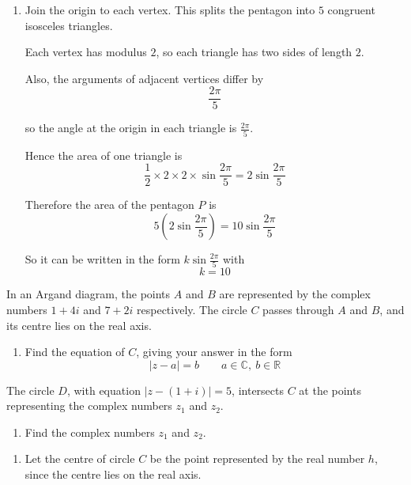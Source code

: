 \documentclass[leqno]{article}
\begin{document}
\begin{enumerate}[
  label=\textbf{\arabic*.},
  leftmargin=*,
  topsep=0pt,
  partopsep=0pt,
  parsep=0pt
]
\begin{djsSolution}
\begin{enumerate}[label=\textbf{(\alph*)}]
  \item Join the origin to each vertex. This splits the pentagon into $5$ congruent isosceles triangles.

Each vertex has modulus $2$, so each triangle has two sides of length $2$.

Also, the arguments of adjacent vertices differ by
\[
\frac{2\pi}{5}
\]

so the angle at the origin in each triangle is $\frac{2\pi}{5}$.

Hence the area of one triangle is
\[
\frac12 \times 2 \times 2 \times \sin\frac{2\pi}{5}
=2\sin\frac{2\pi}{5}
\]

Therefore the area of the pentagon $P$ is
\[
5\left(2\sin\frac{2\pi}{5}\right)=10\sin\frac{2\pi}{5}
\]

So it can be written in the form $k\sin\frac{2\pi}{5}$ with
\[
k=10
\]
\end{enumerate}
\end{djsSolution}


\newpage

\questionitem

In an Argand diagram, the points $A$ and $B$ are represented by the complex numbers $1+4i$ and $7+2i$ respectively. The circle $C$ passes through $A$ and $B$, and its centre lies on the real axis. \\
\begin{enumerate}[label=\textbf{(\alph*)}]
  \item Find the equation of $C$, giving your answer in the form
  \[
  |z-a|=b \qquad a\in\mathbb{C},\ b\in\mathbb{R}
  \]
\end{enumerate}
The circle $D$, with equation $|z-(1+i)|=5$, intersects $C$ at the points representing the complex numbers $z_1$ and $z_2$. \\
\begin{enumerate}[label=\textbf{(\alph*)}, resume]
  \item Find the complex numbers $z_1$ and $z_2$.  \\
\end{enumerate}

\vspace*{10pt}

\begin{djsSolution}
\begin{enumerate}[label=\textbf{(\alph*)}]
  \item Let the centre of circle $C$ be the point represented by the real number $h$, since the centre lies on the real axis.


\end{enumerate}
\end{djsSolution}
\end{enumerate}
\end{document}
